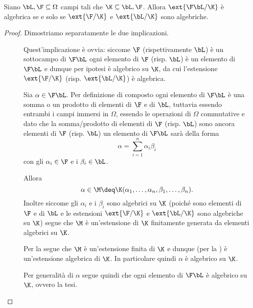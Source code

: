 \begin{proposition}
    {}{}
    Siano $\bL, \F \subseteq \Omega$ campi tali che $\K \subseteq \bL, \F$. Allora $\ext{\F\bL / \K}$ è algebrica se e solo se $\ext{\F / \K}$ e $\ext{\bL / \K}$ sono algebriche.  
\end{proposition}
\begin{proof}
    Dimostriamo separatamente le due implicazioni.
    \begin{description}
        \item[\boximpl] Quest'implicazione è ovvia: siccome $\F$ (rispettivamente $\bL$) è un sottocampo di $\F\bL$ ogni elemento di $\F$ (risp. $\bL$) è un elemento di $\F\bL$ e dunque per ipotesi è algebrico su $\K$, da cui l'estensione $\ext{\F / \K}$ (risp. $\ext{\bL / \K}$) è algebrica.
        \item[\boximplby] Sia $\alpha \in \F\bL$. Per definizione di composto ogni elemento di $\F\bL$ è una somma o un prodotto di elementi di $\F$ e di $\bL$, tuttavia essendo entrambi i campi immersi in $\Omega$, essendo le operazioni di $\Omega$ commutative e dato che la somma/prodotto di elementi di $\F$ (risp. $\bL$) sono ancora elementi di $\F$ (risp. $\bL$) un elemento di $\F\bL$ sarà della forma \[
            \alpha = \sum_{i=1}^n \alpha_i\beta_i
        \] con gli $\alpha_i \in \F$ e i $\beta_i \in \bL$.
        
        Allora \[
            \alpha \in \M \deq \K(\alpha_1, \dots, \alpha_n, \beta_1, \dots, \beta_n).
        \] Inoltre siccome gli $\alpha_i$ e i $\beta_i$ sono algebrici su $\K$ (poiché sono elementi di $\F$ e di $\bL$ e le estensioni $\ext{\F / \K}$ e $\ext{\bL / \K}$ sono algebriche su $\K$) segue che $\M$ è un'estensione di $\K$ finitamente generata da elementi algebrici su $\K$. 
        
        Per la  segue che $\M$ è un'estensione finita di $\K$ e dunque (per la ) è un'estensione algebrica di $\K$.       
        In particolare quindi $\alpha$ è algebrico su $\K$. 
        
        Per generalità di $\alpha$ segue quindi che ogni elemento di $\F\bL$ è algebrico su $\K$, ovvero la tesi.
    \end{description}
\end{proof}